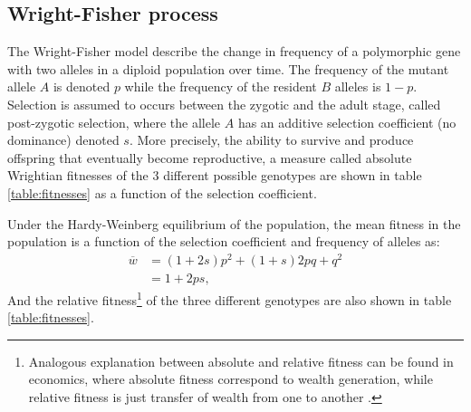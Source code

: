 \subsection{Wright-Fisher process}

The Wright-Fisher model describe the change in frequency of a \gls{polymorphic} gene with two \glspl{allele} in a \gls{diploid} population over time. 
The frequency of the mutant \gls{allele} $A$ is denoted $p$ while the frequency of the resident $B$ \glspl{allele} is $1-p$.
Selection is assumed to occurs between the zygotic and the adult stage, called post-zygotic selection, where the \gls{allele} $A$ has an additive selection coefficient (no dominance) denoted $s$.
More precisely, the ability to survive and produce offspring that eventually become reproductive, a measure called absolute Wrightian fitnesses of the $3$ different possible genotypes are shown in table \ref{table:fitnesses} as a function of the selection coefficient.

\begin{table}[H]
	\centering
	\noindent{}
	\caption[Fitnesses of the different genotypes]{Fitnesses of the different genotypes}\label{table:fitnesses}
\end{table}

Under the Hardy-Weinberg equilibrium of the population, the mean fitness in the population is a function of the selection coefficient and frequency of \glspl{allele} as:
\begin{align}
\overline{w} &= (1+2s)p^2 + (1+s)2pq + q^2 \\
&= 1 + 2ps,
\end{align}
And the relative fitness\footnote{Analogous explanation between absolute and relative fitness can be found in economics, where absolute fitness correspond to wealth generation, while relative fitness is just transfer of wealth from one to another \citep{Masel2016}.} of the three different genotypes are also shown in table \ref{table:fitnesses}. 


